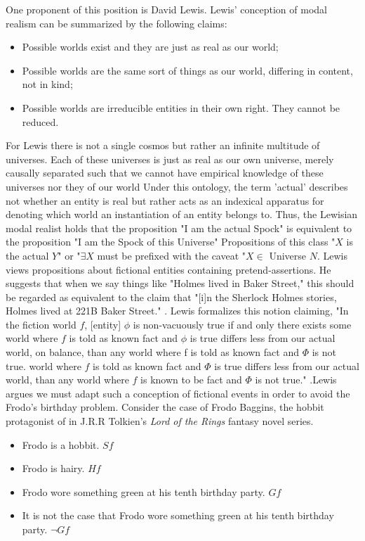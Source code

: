  
	 One proponent of this position is David Lewis. Lewis' conception of modal realism can be summarized by the following claims:
\begin{itemize}
	\item Possible worlds exist and they are just as real as our world;
	
	\item Possible worlds are the same sort of things as our world,  differing in content, not in kind;
	\item Possible worlds are irreducible entities in their own right. They cannot be reduced.
\end{itemize}
\cite{lewis2001counterfactuals} 
 For Lewis there is not a single cosmos but rather an infinite multitude of universes. Each of these universes is just as real as our own universe, merely causally separated such that we cannot have empirical knowledge of these universes nor they of our world\cite{lewis1986on} Under this ontology, the term 'actual' describes not whether an entity is real but rather acts as an indexical apparatus for denoting which world an instantiation of an entity belongs to. Thus, the Lewisian modal realist holds that the proposition "I am the actual Spock" is equivalent to the proposition "I am the Spock of this Universe" Propositions of this class "$X$ is the actual $Y$" or "$\exists X$ must be prefixed with the caveat "$X\in$ Universe $N$.
Lewis views propositions about fictional entities containing pretend-assertions.\cite{Lewis1978-LEWTIF} He suggests
that when we say things like "Holmes lived in Baker Street," this should be regarded as
equivalent to the claim that "[i]n the Sherlock Holmes stories, Holmes lived at 221B Baker Street." \cite{Lewis1978-LEWTIF}. Lewis formalizes this notion claiming, "In the fiction world $f$, [entity] $\phi$ is non-vacuously true if and only there exists some 
world where $f$ is told as known fact and $\phi$ is true differs less from our actual world, on
balance, than any world where f is told as known fact and $\Phi$ is not true.
world where $f$ is told as known fact and $\Phi$ is true differs less from our actual world, than any world where $f$ is known to be fact and $\Phi$ is not true." \cite{Lewis}.Lewis argues we must adapt such a conception of fictional events in order to avoid the Frodo's birthday problem. \cite{Lewis1978-LEWTIF} Consider the case of Frodo Baggins, the hobbit protagonist of in J.R.R Tolkien's \textit{Lord of the Rings} fantasy novel series. \begin{itemize}
	\item Frodo is a hobbit. $Sf$
	\item Frodo is hairy. $Hf$
	\item Frodo wore something green at his tenth birthday party. $Gf$
	\item  It is not the case that Frodo wore something green at his tenth birthday party. $\neg Gf$
\end{itemize}
